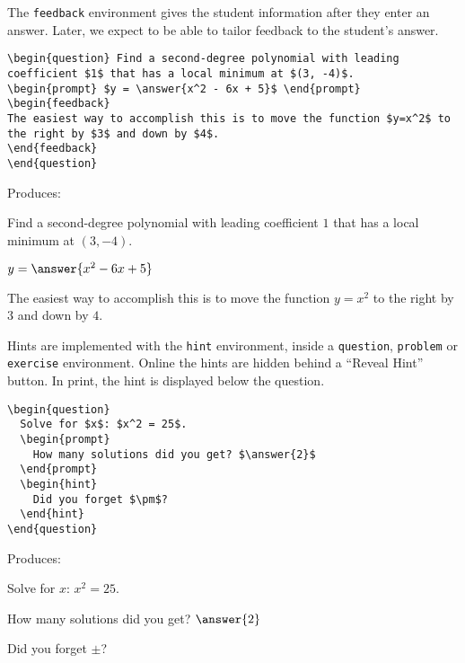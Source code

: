 \documentclass{ximera}
\begin{document}
\begin{example} The \verb!feedback! environment gives the student information after they enter an answer. Later, we expect to be able to tailor feedback to the student's answer.

\begin{verbatim}
\begin{question} Find a second-degree polynomial with leading coefficient $1$ that has a local minimum at $(3, -4)$.
\begin{prompt} $y = \answer{x^2 - 6x + 5}$ \end{prompt}
\begin{feedback}
The easiest way to accomplish this is to move the function $y=x^2$ to the right by $3$ and down by $4$.
\end{feedback}
\end{question}
\end{verbatim}

Produces:

\begin{question} Find a second-degree polynomial with leading coefficient $1$ that has a local minimum at $(3, -4)$.
\begin{prompt} $y = \answer{x^2 - 6x + 5}$ \end{prompt}
\begin{feedback}
The easiest way to accomplish this is to move the function $y=x^2$ to the right by $3$ and down by $4$.
\end{feedback}
\end{question}

\end{example}

\begin{example} 
Hints are implemented with the \verb!hint! environment, inside a \verb!question!, \verb!problem! or \verb!exercise!  environment. Online the hints are hidden behind a ``Reveal Hint'' button. In print, the hint is displayed below the question.

\begin{verbatim}
\begin{question}
  Solve for $x$: $x^2 = 25$. 
  \begin{prompt} 
    How many solutions did you get? $\answer{2}$ 
  \end{prompt}
  \begin{hint} 
    Did you forget $\pm$?
  \end{hint}
\end{question}
\end{verbatim}

Produces:

\begin{question}
  Solve for $x$: $x^2 = 25$. 
  \begin{prompt} 
    How many solutions did you get? $\answer{2}$ 
  \end{prompt}
  \begin{hint} 
    Did you forget $\pm$?
  \end{hint}
\end{question}

\end{example}
\end{document}
